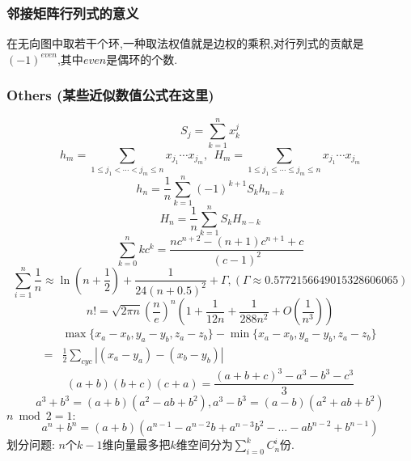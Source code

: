 \begin{small}
\subsubsection{邻接矩阵行列式的意义}
在无向图中取若干个环,一种取法权值就是边权的乘积,对行列式的贡献是$(-1)^{even}$,其中$even$是偶环的个数.

\subsubsection{Others (某些近似数值公式在这里)}
\[ S_j = \sum_{k=1}^nx_k^j \]
\[ h_m = \sum_{1\leq j_1 < \cdots < j_m \leq n} x_{j_1}\cdots x_{j_m},\ \ H_m = \sum_{1\leq j_1 \leq \cdots \leq j_m \leq n} x_{j_1}\cdots x_{j_m} \]
\[ h_n = \frac{1}{n}\sum_{k=1}^n(-1)^{k+1}S_kh_{n-k} \]
\[ H_n = \frac{1}{n}\sum_{k=1}^nS_kH_{n-k} \]
\[ \sum_{k=0}^nkc^k = \frac{nc^{n+2}-(n+1)c^{n+1}+c}{(c-1)^2} \]
\[ \sum_{i=1}^n\frac 1n\approx\ln(n + \frac12) + \frac{1}{24(n+0.5)^2}+\Gamma,(\Gamma\approx0.5772156649015328606065)\]
\[ n! = \sqrt{2\pi n}(\frac{n}{e})^n(1+\frac{1}{12n}+\frac{1}{288n^2}+O(\frac{1}{n^3})) \]
\[ \begin{aligned}
 &\max{\{x_a-x_b, y_a-y_b, z_a-z_b\}} - \min{\{x_a-x_b, y_a-y_b, z_a-z_b\}} \\
=& \frac{1}{2}\sum_{cyc}\left| (x_a-y_a)-(x_b-y_b) \right|
\end{aligned} \]
\[ (a+b)(b+c)(c+a) = \frac{(a+b+c)^3 - a^3 - b^3 - c^3}{3} \]
\[ a^3+b^3=(a+b)(a^2-ab+b^2),a^3-b^3=(a-b)(a^2+ab+b^2) \]
$n\bmod 2=1:$
\[ a^n+b^n=(a+b)(a^{n-1}-a^{n-2}b+a^{n-3}b^2-...-ab^{n-2}+b^{n-1})\]
划分问题: $n$个$k-1$维向量最多把$k$维空间分为$\sum_{i=0}^{k}C_n^i$份.
\end{small}
